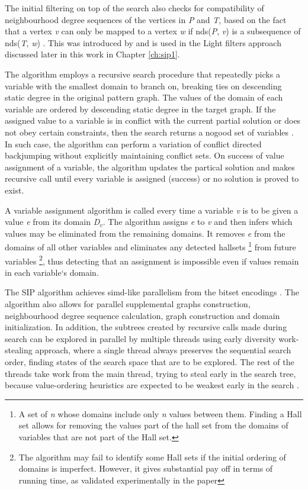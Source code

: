 \documentclass{l4proj}
\begin{document}
The initial filtering on top of the search also checks for compatibility of neighbourhood degree sequences of the vertices in \emph{P} and \emph{T}, based on the fact that a vertex \emph{v} can only be mapped to a vertex \emph{w} if nds(\emph{P}, \emph{v}) is a subsequence of nds(\emph{T}, \emph{w}) \cite{Solnon:2010}. This was introduced by \cite{Solnon:2010} and is used in the Light filters approach discussed later in this work in Chapter \ref{ch:sip1}. 

The algorithm employs a recursive search procedure that repeatedly picks a variable with the smallest domain to branch on, breaking ties on descending static degree in the original pattern graph. The values of the domain of each variable are ordered by descending static degree in the target graph. If the assigned value to a variable is in conflict with the current partial solution or does not obey certain constraints, then the search returns a nogood set of variables \cite{CP2015}. In such case, the algorithm can perform a variation of conflict directed backjumping \cite{Prosser:1993} without explicitly maintaining conflict sets. On success of value assignment of a variable, the algorithm updates the partical solution and makes recursive call until every variable is assigned (success) or no solution is proved to exist. 

A variable assignment algorithm is called every time a variable \emph{v} is to be given a value \emph{e} from its domain \emph{D$_{v}$}. The algorithm assigns \emph{e} to \emph{v} and then infers which values may be eliminated from the remaining domains. It removes \emph{e} from the domains of all other variables and eliminates any detected \glspl{hallset} \footnote{A set of \emph{n} whose domains include only \emph{n} values between them. Finding a Hall set allows for removing the values part of the hall set from the domains of variables that are not part of the Hall set.} from future variables \footnote{The algorithm may fail to identify some Hall sets if the initial ordering of domains is imperfect. However, it gives substantial pay off in terms of running time, as validated experimentally in the paper}, thus detecting that an assignment is impossible even if values remain in each variable`s domain.

The SIP algorithm achieves \gls{simd}-like parallelism from the bitset encodings \cite{CP2015}. The algorithm also allows for parallel supplemental graphs construction, neighbourhood degree sequence calculation, graph construction and domain initialization. In addition, the subtrees created by recursive calls made during search can be explored in parallel by multiple threads using early diversity work-stealing approach, where a single thread always preserves the sequential search order, finding states of the search space that are to be explored. The rest of the threads take work from the main thread, trying to steal early in the search tree, because value-ordering heuristics are expected to be weakest early in the search \cite{Harvey:1995}.
\end{document}
